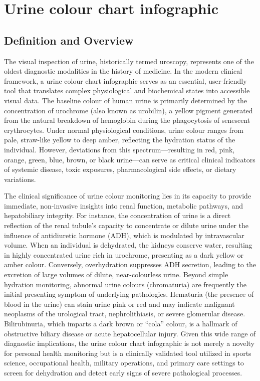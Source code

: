 \chapter{Urine colour chart infographic}

\section*{Definition and Overview}
The visual inspection of urine, historically termed uroscopy, represents one of the oldest diagnostic modalities in the history of medicine. In the modern clinical framework, a urine colour chart infographic serves as an essential, user-friendly tool that translates complex physiological and biochemical states into accessible visual data. The baseline colour of human urine is primarily determined by the concentration of urochrome (also known as urobilin), a yellow pigment generated from the natural breakdown of hemoglobin during the phagocytosis of senescent erythrocytes. Under normal physiological conditions, urine colour ranges from pale, straw-like yellow to deep amber, reflecting the hydration status of the individual. However, deviations from this spectrum---resulting in red, pink, orange, green, blue, brown, or black urine---can serve as critical clinical indicators of systemic disease, toxic exposures, pharmacological side effects, or dietary variations.

The clinical significance of urine colour monitoring lies in its capacity to provide immediate, non-invasive insights into renal function, metabolic pathways, and hepatobiliary integrity. For instance, the concentration of urine is a direct reflection of the renal tubule's capacity to concentrate or dilute urine under the influence of antidiuretic hormone (ADH), which is modulated by intravascular volume. When an individual is dehydrated, the kidneys conserve water, resulting in highly concentrated urine rich in urochrome, presenting as a dark yellow or amber colour. Conversely, overhydration suppresses ADH secretion, leading to the excretion of large volumes of dilute, near-colourless urine. Beyond simple hydration monitoring, abnormal urine colours (chromaturia) are frequently the initial presenting symptom of underlying pathologies. Hematuria (the presence of blood in the urine) can stain urine pink or red and may indicate malignant neoplasms of the urological tract, nephrolithiasis, or severe glomerular disease. Bilirubinuria, which imparts a dark brown or ``cola'' colour, is a hallmark of obstructive biliary disease or acute hepatocellular injury. Given this wide range of diagnostic implications, the urine colour chart infographic is not merely a novelty for personal health monitoring but is a clinically validated tool utilized in sports science, occupational health, military operations, and primary care settings to screen for dehydration and detect early signs of severe pathological processes.

